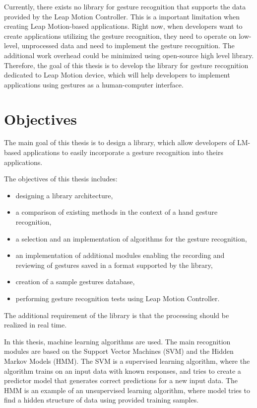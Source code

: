 Currently, there exists no library for gesture recognition that supports the data provided by the Leap Motion Controller.
This is a important limitation when creating Leap Motion-based applications.
Right now, when developers want to create applications utilizing the gesture recognition, they need to operate on low-level, unprocessed data and need to implement the gesture recognition.
The additional work overhead could be minimized using open-source high level library.
Therefore, the goal of this thesis is to develop the library for gesture recognition dedicated to Leap Motion device, which will help developers to implement applications using gestures as a human-computer interface.


\section{Objectives}

The main goal of this thesis is to design a library, which allow developers of LM-based applications to easily incorporate a gesture recognition into theirs applications.

The objectives of this thesis includes:
\begin{itemize}
\item designing a library architecture, 
\item a comparison of existing methods in the context of a hand gesture recognition,
\item a selection and an implementation of algorithms for the gesture recognition,
\item an implementation of additional modules enabling the recording and reviewing of gestures saved in a format supported by the library,
\item creation of a sample gestures database,
\item performing gesture recognition tests using Leap Motion Controller.
\end{itemize}
The additional requirement of the library is that the processing should be realized in real time.

In this thesis, machine learning algorithms are used. 
The main recognition modules are based on the Support Vector Machines (SVM) and the Hidden Markov Models (HMM). 
The SVM is a supervised learning algorithm, where the algorithm trains on an input data with known responses, and tries to create a predictor model that generates correct predictions for a new input data.
The HMM is an example of an unsupervised learning algorithm, where model tries to find a hidden structure of data using provided training samples. 

